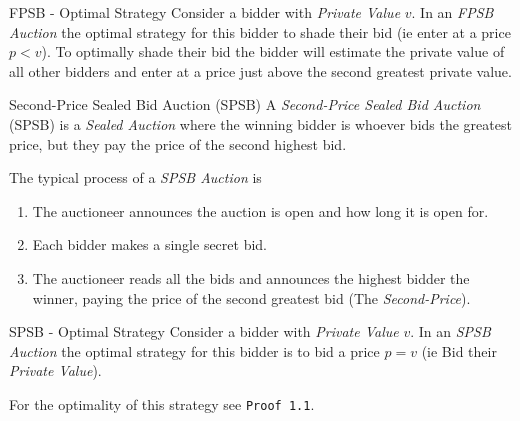 \documentclass[11pt,a4paper]{article}
\begin{document}
  \begin{proposition}{FPSB - Optimal Strategy}
    Consider a bidder with \textit{Private Value} $v$. In an \textit{FPSB Auction} the optimal strategy for this bidder to shade their bid (ie enter at a price $p<v$). To optimally shade their bid the bidder will estimate the private value of all other bidders and enter at a price just above the second greatest private value.
  \end{proposition}

  \begin{definition}{Second-Price Sealed Bid Auction (SPSB)}
    A \textit{Second-Price Sealed Bid Auction} (SPSB) is a \textit{Sealed Auction} where the winning bidder is whoever bids the greatest price, but they pay the price of the second highest bid.
    \par The typical process of a \textit{SPSB Auction} is
    \begin{enumerate}
      \item The auctioneer announces the auction is open and how long it is open for.
      \item Each bidder makes a single secret bid.
      \item The auctioneer reads all the bids and announces the highest bidder the winner, paying the price of the second greatest bid (The \textit{Second-Price}).
    \end{enumerate}
  \end{definition}

  \begin{proposition}{SPSB - Optimal Strategy}
    Consider a bidder with \textit{Private Value} $v$. In an \textit{SPSB Auction} the optimal strategy for this bidder is to bid a price $p=v$ (ie Bid their \textit{Private Value}).
    \par For the optimality of this strategy see \texttt{Proof 1.1}.
  \end{proposition}
\end{document}
